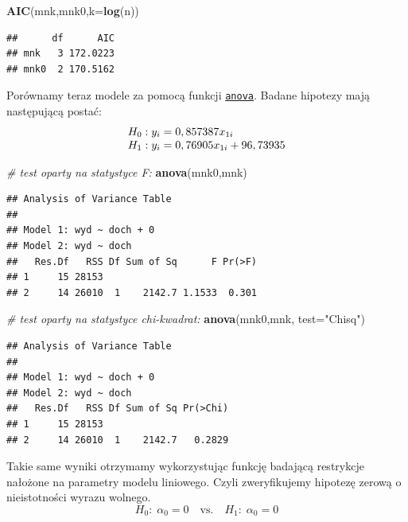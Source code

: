 \documentclass[polish,]{book}
\newenvironment{Shaded}{\begin{snugshade}}{\end{snugshade}}
\newcommand{\CommentTok}[1]{\textcolor[rgb]{0.56,0.35,0.01}{\textit{#1}}}
\newcommand{\DataTypeTok}[1]{\textcolor[rgb]{0.13,0.29,0.53}{#1}}
\newcommand{\KeywordTok}[1]{\textcolor[rgb]{0.13,0.29,0.53}{\textbf{#1}}}
\newcommand{\NormalTok}[1]{#1}
\newcommand{\StringTok}[1]{\textcolor[rgb]{0.31,0.60,0.02}{#1}}
\begin{document}
\begin{Shaded}
\begin{Highlighting}[]
\KeywordTok{AIC}\NormalTok{(mnk,mnk0,}\DataTypeTok{k=}\KeywordTok{log}\NormalTok{(n))}
\end{Highlighting}
\end{Shaded}

\begin{verbatim}
##      df      AIC
## mnk   3 172.0223
## mnk0  2 170.5162
\end{verbatim}

Porównamy teraz modele za pomocą funkcji \href{https://rdrr.io/r/stats/anova.html}{\texttt{anova}}. Badane hipotezy mają
następującą postać:
\begin{equation*}
\begin{array}{r@{}l}
H_0:&\;y_i=0,857387x_{1i}\\
H_1:&\;y_i=0,76905x_{1i}+96,73935
\end{array}
\end{equation*}

\begin{Shaded}
\begin{Highlighting}[]
\CommentTok{# test oparty na statystyce F:}
\KeywordTok{anova}\NormalTok{(mnk0,mnk)}
\end{Highlighting}
\end{Shaded}

\begin{verbatim}
## Analysis of Variance Table
## 
## Model 1: wyd ~ doch + 0
## Model 2: wyd ~ doch
##   Res.Df   RSS Df Sum of Sq      F Pr(>F)
## 1     15 28153                           
## 2     14 26010  1    2142.7 1.1533  0.301
\end{verbatim}

\begin{Shaded}
\begin{Highlighting}[]
\CommentTok{# test oparty na statystyce chi-kwadrat:}
\KeywordTok{anova}\NormalTok{(mnk0,mnk, }\DataTypeTok{test=}\StringTok{"Chisq"}\NormalTok{)}
\end{Highlighting}
\end{Shaded}

\begin{verbatim}
## Analysis of Variance Table
## 
## Model 1: wyd ~ doch + 0
## Model 2: wyd ~ doch
##   Res.Df   RSS Df Sum of Sq Pr(>Chi)
## 1     15 28153                      
## 2     14 26010  1    2142.7   0.2829
\end{verbatim}

Takie same wyniki otrzymamy wykorzystując funkcję badającą restrykcje nałożone
na parametry modelu liniowego. Czyli zweryfikujemy hipotezę zerową o
nieistotności wyrazu wolnego.
\[
H_0:\;\alpha_0=0\quad\mbox{vs.}\quad H_1:\;\alpha_0=0
\]
\end{document}
